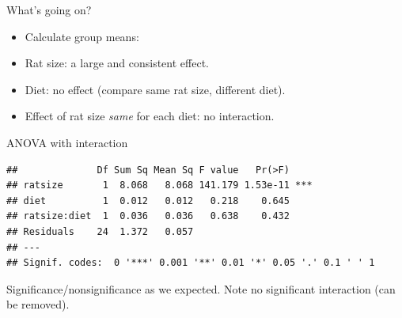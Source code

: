 \begin{frame}[fragile]{What's going on?}
  
  \begin{itemize}
  \item Calculate group means:
    
\begin{knitrout}
\color{fgcolor}
\end{knitrout}
\item Rat size: a large and consistent effect.
\item Diet: no effect (compare same rat size, different
  diet).
\item Effect of rat size \emph{same} for each diet: no interaction.
  \end{itemize}

\end{frame}

\begin{frame}[fragile]{ANOVA with interaction}
  
\begin{knitrout}
\color{fgcolor}\begin{kframe}
\begin{alltt}
\hlkwb{=}\hlopt{~}\hlopt{*}
\end{alltt}
\begin{verbatim}
##              Df Sum Sq Mean Sq F value   Pr(>F)    
## ratsize       1  8.068   8.068 141.179 1.53e-11 ***
## diet          1  0.012   0.012   0.218    0.645    
## ratsize:diet  1  0.036   0.036   0.638    0.432    
## Residuals    24  1.372   0.057                     
## ---
## Signif. codes:  0 '***' 0.001 '**' 0.01 '*' 0.05 '.' 0.1 ' ' 1
\end{verbatim}
\end{kframe}
\end{knitrout}

Significance/nonsignificance as we expected. Note no significant
interaction (can be removed). 
  
\end{frame}

